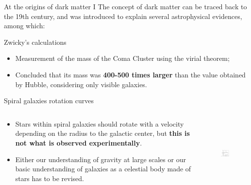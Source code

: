 \documentclass[8pt]{beamer}
\begin{document}
\begin{frame}{At the origins of dark matter I}
\justifying
The concept of dark matter can be traced back to the 19th century, and \alert{was introduced to explain several astrophysical evidences}, among which: \vfill

\vspace{10pt}	
\begin{block}{ \centering Zwicky's calculations}\end{block}

\begin{itemize}
\justifying
\item Measurement of the mass of the Coma Cluster using the virial theorem;
\item Concluded that its mass was \textbf{400-500 times larger} than the value obtained by Hubble, considering only visible galaxies. %
\end{itemize} \vfill

\vspace{10pt}	
\begin{block}{ \centering Spiral galaxies rotation curves}\end{block}

\begin{columns}
	\begin{column}{0.65\textwidth}
\begin{itemize}
\justifying
\vspace{-5pt}	
\item Stars within spiral galaxies should rotate with a velocity depending on the radius to the galactic center, but \textbf{this is not what is observed experimentally}.%
\vspace{1pt}	
\item Either our understanding of gravity at large scales or our basic understanding of galaxies as a celestial body made of stars has to be revised.
\end{itemize} 
\end{column}

\begin{column}{0.44\textwidth}
\begin{figure}[htbp]
\begin{center}
\includegraphics[width=4.5cm, height=3.7cm]{figs/RotationCurve.jpeg}
\end{center}
\end{figure}
\end{column}
\end{columns} \vfill

\end{frame}
\end{document}
